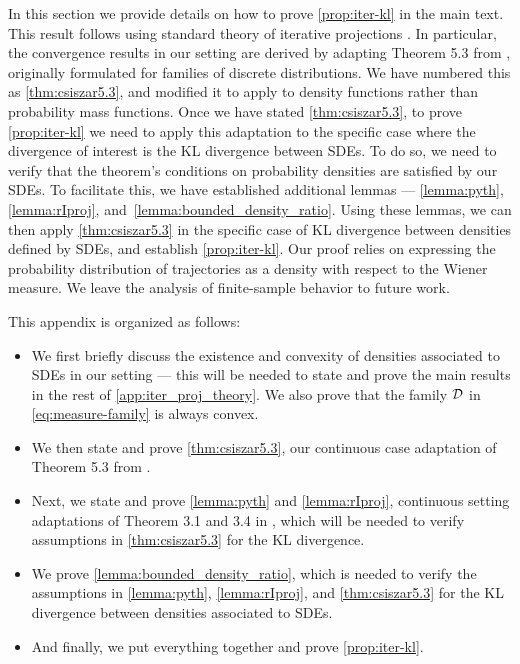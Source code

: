 


In this section we provide details on how to prove \cref{prop:iter-kl} in the main text. This result follows using standard theory of iterative projections \citep{csiszar1975divergence, csiszar2004information, benamou2015iterative}. 
In particular, the convergence results in our setting are derived by adapting Theorem 5.3 from  \citet{csiszar2004information}, originally formulated for families of discrete distributions. We have numbered this as \cref{thm:csiszar5.3}, and modified it to apply to density functions rather than probability mass functions. Once we have stated \cref{thm:csiszar5.3}, to prove \cref{prop:iter-kl} we need to apply this adaptation to the specific case where the divergence of interest is the KL divergence between SDEs. To do so, we need to verify that the theorem's conditions on probability densities are satisfied by our SDEs. To facilitate this, we have established additional lemmas --- \cref{lemma:pyth}, \cref{lemma:rIproj}, and~\cref{lemma:bounded_density_ratio}. Using these lemmas, we can then apply \cref{thm:csiszar5.3} in the specific case of KL divergence between densities defined by SDEs, and establish \cref{prop:iter-kl}. Our proof relies on expressing the probability distribution of trajectories as a density with respect to the Wiener measure. We leave the analysis of finite-sample behavior to future work.



This appendix is organized as follows:
\begin{itemize}
    \item We first briefly discuss the existence and convexity of densities associated to SDEs in our setting --- this will be needed to state and prove the main results in the rest of \cref{app:iter_proj_theory}. We also prove that the family $\mathcal{D}$ in \cref{eq:measure-family} is always convex.
    \item We then state and prove \cref{thm:csiszar5.3}, our continuous case adaptation of Theorem 5.3 from \citet{csiszar2004information}.
    \item Next, we state and prove \cref{lemma:pyth} and \cref{lemma:rIproj}, continuous setting adaptations of Theorem 3.1 and 3.4 in \citet{csiszar2004information}, which will be needed to verify assumptions in \cref{thm:csiszar5.3} for the KL divergence.
    \item We prove \cref{lemma:bounded_density_ratio}, which is needed to verify the assumptions in \cref{lemma:pyth}, \cref{lemma:rIproj}, and \cref{thm:csiszar5.3} for the KL divergence between densities associated to SDEs.
    \item And finally, we put everything together and prove \cref{prop:iter-kl}.
\end{itemize}

